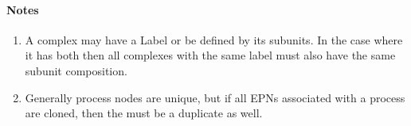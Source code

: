 \paragraph*{Notes}

\begin{enumerate}
\item A complex may have a Label or be defined by its subunits. In the case where it has both then all complexes with the same label must also have the same subunit composition.
\item  Generally process nodes are unique, but if all EPNs associated with a process are cloned, then the  must be a duplicate as well.
\end{enumerate}





